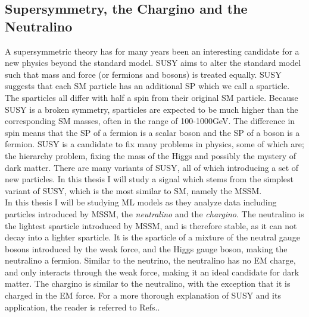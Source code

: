 \subsection{Supersymmetry, the Chargino and the Neutralino}\label{subsec:SS}
A supersymmetric theory has for many years been an interesting candidate for a new physics beyond the standard 
model. \ac{SUSY} aims to alter the standard model such that mass and force (or fermions and bosons) is treated equally. 
\ac{SUSY} suggests that each \ac{SM} particle has an additional \ac{SP} which we call a sparticle. 
The sparticles all differ with half a spin from their original \ac{SM} particle. Because \ac{SUSY} is a broken symmetry, 
sparticles are expected to be much higher than the corresponding \ac{SM} masses, often in the range of 100-1000GeV. 
The difference in spin means that the \ac{SP} of a fermion is a scalar boson and the \ac{SP} of a boson is a fermion. \ac{SUSY} is a 
candidate to fix many problems in physics, some of which are; the hierarchy problem, fixing the mass of the Higgs 
and possibly the mystery of dark matter. There are many variants of \ac{SUSY}, all of which introducing a set of new 
particles. In this thesis I will study a signal which stems from the simplest variant of \ac{SUSY}, which is the most 
similar to \ac{SM}, namely the \ac{MSSM}. 
\\
In this thesis I will be studying \ac{ML} models as they analyze data including particles introduced by \ac{MSSM}, the \emph{neutralino} and 
the \emph{chargino}. The neutralino is the lightest sparticle introduced by \ac{MSSM}, and is therefore stable, as it can not decay into a lighter sparticle. 
It is the sparticle of a mixture of the neutral gauge bosons introduced by the weak force, and the Higgs gauge boson, making the neutralino a 
fermion. Similar to the neutrino, the neutralino has no \ac{EM} charge, and only interacts through the weak force, making it an ideal candidate 
for dark matter. The chargino is similar to the neutralino, with the exception that it is charged in the \ac{EM} force. 
For a more thorough explanation of \ac{SUSY} and its application, the reader is referred to Refs.\cite{SUSY}. 